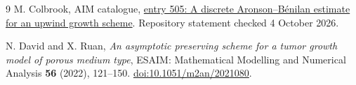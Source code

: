 \documentclass[11pt,a4paper]{article}
\theoremstyle{remark}
\begin{document}
\begin{thebibliography}{9}
M. Colbrook, AIM catalogue, \href{https://github.com/MColbrook/AIM/blob/59a8f0c2957dd272f56bcf282dfe0c066a15f441/problems/505-upwind-discrete-aronson-benilan.md}{entry 505: A discrete Aronson--B\'enilan estimate for an upwind growth scheme}. Repository statement checked 4 October 2026.

N. David and X. Ruan, \emph{An asymptotic preserving scheme for a tumor growth model of porous medium type}, ESAIM: Mathematical Modelling and Numerical Analysis \textbf{56} (2022), 121--150. \href{https://doi.org/10.1051/m2an/2021080}{doi:10.1051/m2an/2021080}.
\end{thebibliography}
\end{document}
